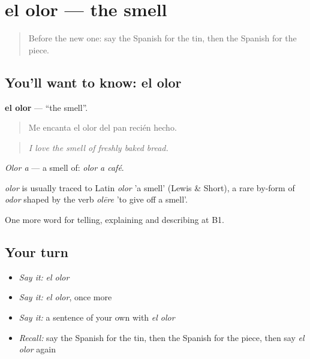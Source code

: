\section[el olor]{el olor — the smell}

\label{lesson:ES-C775-olor}



\begin{quote}
Before the new one: say the Spanish for the tin, then the Spanish for the piece.
\end{quote}

\subsection*{You'll want to know: el olor}
\textbf{el olor} — \textquotedblleft{}the smell\textquotedblright{}.

\begin{quote}
Me encanta el olor del pan recién hecho.
\end{quote}

\begin{quote}
\emph{I love the smell of freshly baked bread.}
\end{quote}

\emph{Olor a} — a smell of: \emph{olor a café}.

\begin{cousinweb}
\emph{olor} is usually traced to Latin \emph{olor} 'a smell' (Lewis \& Short), a rare by-form of \emph{odor} shaped by the verb \emph{olēre} 'to give off a smell'.
\end{cousinweb}

\begin{grammarlens}[title={What you've built}]
One more word for telling, explaining and describing at B1.
\end{grammarlens}

\subsection*{Your turn}
\begin{itemize}
\raggedright
  \item \emph{Say it:} \emph{el olor}
  \item \emph{Say it:} \emph{el olor}, once more
  \item \emph{Say it:} a sentence of your own with \emph{el olor}
  \item \emph{Recall:} say the Spanish for the tin, then the Spanish for the piece, then say \emph{el olor} again
\end{itemize}

